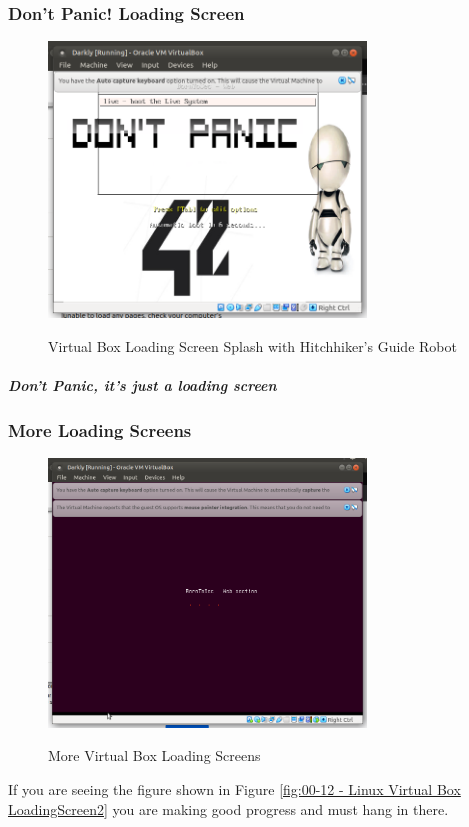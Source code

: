 \subsubsection{Don't Panic! Loading Screen}

\begin{figure}[!htb]
    \centering
    \includegraphics[width=0.752\textwidth]{images/00-11.png}\\[0cm]  
    \caption[Virtual Box]{Virtual Box Loading Screen Splash with Hitchhiker's Guide Robot}
    \label{fig:00-11 - Linux Virtual Box LoadingScreen1} 
\end{figure}
\subparagraph{Don't Panic, it's just a loading screen}

\subsubsection{More Loading Screens}
\begin{figure}[!htb]
    \centering
    \includegraphics[width=0.752\textwidth]{images/00-12.png}\\[0cm]  
    \caption[Virtual Box]{More Virtual Box Loading Screens}
    \label{fig:00-12 - Linux Virtual Box LoadingScreen2} 
\end{figure}
If you are seeing the figure shown in Figure \vref{fig:00-12 - Linux Virtual Box LoadingScreen2}
you are making good progress and must hang in there.

